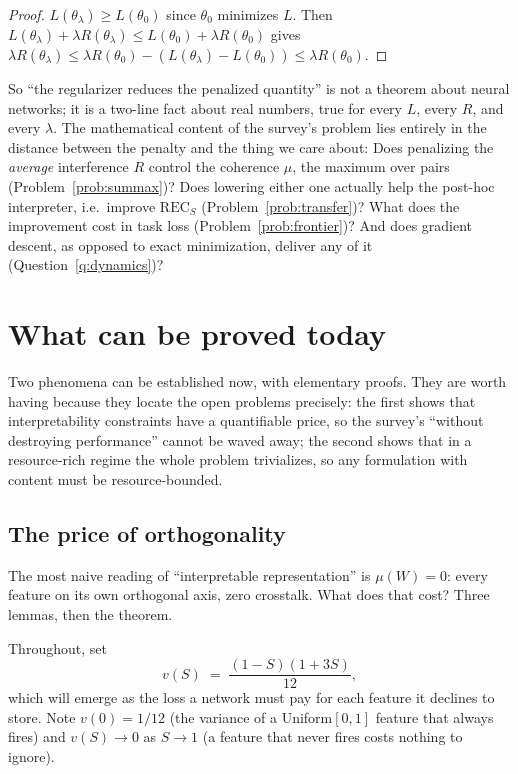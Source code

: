 \documentclass[11pt]{amsart}
\theoremstyle{plain}
\theoremstyle{definition}
\begin{document}
\begin{proof}
$L(\theta_\lambda)\ge L(\theta_0)$ since $\theta_0$ minimizes $L$. Then $L(\theta_\lambda)+\lambda R(\theta_\lambda)\le L(\theta_0)+\lambda R(\theta_0)$ gives $\lambda R(\theta_\lambda)\le \lambda R(\theta_0)-(L(\theta_\lambda)-L(\theta_0))\le\lambda R(\theta_0)$.
\end{proof}

So ``the regularizer reduces the penalized quantity'' is not a theorem about neural networks; it is a two-line fact about real numbers, true for every $L$, every $R$, and every $\lambda$. The mathematical content of the survey's problem lies entirely in the distance between the penalty and the thing we care about: Does penalizing the \emph{average} interference $R$ control the coherence $\mu$, the maximum over pairs (Problem~\ref{prob:summax})? Does lowering either one actually help the post-hoc interpreter, i.e.\ improve $\mathrm{REC}_S$ (Problem~\ref{prob:transfer})? What does the improvement cost in task loss (Problem~\ref{prob:frontier})? And does gradient descent, as opposed to exact minimization, deliver any of it (Question~\ref{q:dynamics})?

\section{What can be proved today}\label{sec:proved}

Two phenomena can be established now, with elementary proofs. They are worth having because they locate the open problems precisely: the first shows that interpretability constraints have a quantifiable price, so the survey's ``without destroying performance'' cannot be waved away; the second shows that in a resource-rich regime the whole problem trivializes, so any formulation with content must be resource-bounded.

\subsection{The price of orthogonality}

The most naive reading of ``interpretable representation'' is $\mu(W)=0$: every feature on its own orthogonal axis, zero crosstalk. What does that cost? Three lemmas, then the theorem.

Throughout, set
\[
v(S) \;=\; \frac{(1-S)(1+3S)}{12},
\]
which will emerge as the loss a network must pay for each feature it declines to store. Note $v(0)=1/12$ (the variance of a Uniform$[0,1]$ feature that always fires) and $v(S)\to0$ as $S\to1$ (a feature that never fires costs nothing to ignore).
\end{document}
